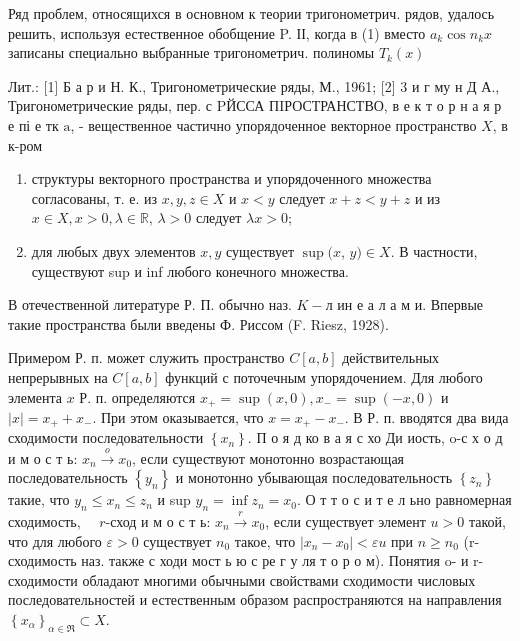 \documentclass[10pt]{article}
\begin{document}
Ряд проблем, относящихся в основном к теории тригонометрич. рядов, удалось решить, используя естественное обобщение P. ІІ, когда в (1) вместо $a_{k} \cos n_{k} x$ записаны специально выбранные тригонометрич. полиномы $T_{k}(x)$



Лит.: [1] Б а р и Н. К., Тригонометрические ряды, М., 1961; [2] 3 и г му н Д А., Тригонометрические ряды, пер. с PЙССА ПIРОСТРАНСТВО, в е к т о р н а я р е пі е тк $\mathrm{a}$, - вещественное частично упорядоченное векторное пространство $X$, в к-ром



\begin{enumerate}

  \item структуры векторного пространства и упорядоченного множества согласованы, т. е. из $x, y, z \in X$ и $x<y$ следует $x+z<y+z$ и из $x \in X, x>0, \lambda \in \mathbb{R}$, $\lambda>0$ следует $\lambda x>0$;



  \item для любых двух элементов $x, y$ существует $\sup (x$, $y) \in X$. В частности, существуют sup и inf любого конечного множества.



\end{enumerate}



В отечественной литературе Р. П. обычно наз. $K-л$ ин е а л а м и. Впервые такие пространства были введены Ф. Риссом (F. Riesz, 1928).



Примером Р. п. может служить пространство $C[a, b]$ действительных непрерывных на $C[a, b]$ функций с поточечным упорядочением. Для любого элемента $x$ Р. п. определяются $x_{+}=\sup (x, 0), x_{-}=\sup (-x, 0)$ и $|x|=x_{+}+x_{-}$. При этом оказывается, что $x=x_{+}-x_{-}$. В Р. п. вводятся два вида сходимости последовательности $\left\{x_{n}\right\}$. П о я д ко в а я с хо Ди иость, o-с х о д и м о с т ь: $x_{n} \stackrel{o}{\rightarrow} x_{0}$, если существуют монотонно возрастающая последовательность $\left\{y_{n}\right\}$ и монотонно убывающая последовательность $\left\{z_{n}\right\}$ такие, что $y_{n} \leqslant x_{n} \leqslant z_{n}$ и sup $y_{n}=\inf z_{n}=x_{0}$. О т т о с и т е л ьно равномерная сходимость, $\quad r$-сход и м о с т ь: $x_{n} \stackrel{r}{\rightarrow} x_{0}$, если существует элемент $u>0$ такой, что для любого $\varepsilon>0$ существует $n_{0}$ такое, что $\left|x_{n}-x_{0}\right|<\varepsilon u$ при $n \geqslant n_{0}$ (r-сходимость наз. также с ходи мост ь ю с ре г у ля т о р о м). Понятия o- и r-сходимости обладают многими обычными свойствами сходимости числовых последовательностей и естественным образом распространяются на направления $\left\{x_{\alpha}\right\}_{\alpha \in \Re} \subset X$.
\end{document}
